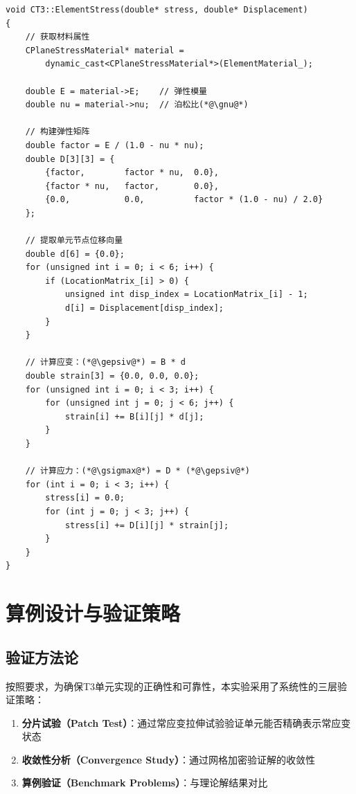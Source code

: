 \documentclass[12pt,a4paper]{article}
\begin{document}
\begin{lstlisting}[caption=单元应力计算实现]
void CT3::ElementStress(double* stress, double* Displacement)
{
    // 获取材料属性
    CPlaneStressMaterial* material = 
        dynamic_cast<CPlaneStressMaterial*>(ElementMaterial_);
    
    double E = material->E;    // 弹性模量
    double nu = material->nu;  // 泊松比(*@\gnu@*)
    
    // 构建弹性矩阵
    double factor = E / (1.0 - nu * nu);
    double D[3][3] = {
        {factor,        factor * nu,  0.0},
        {factor * nu,   factor,       0.0},
        {0.0,           0.0,          factor * (1.0 - nu) / 2.0}
    };
    
    // 提取单元节点位移向量
    double d[6] = {0.0};
    for (unsigned int i = 0; i < 6; i++) {
        if (LocationMatrix_[i] > 0) {
            unsigned int disp_index = LocationMatrix_[i] - 1;
            d[i] = Displacement[disp_index];
        }
    }
    
    // 计算应变：(*@\gepsiv@*) = B * d
    double strain[3] = {0.0, 0.0, 0.0};
    for (unsigned int i = 0; i < 3; i++) {
        for (unsigned int j = 0; j < 6; j++) {
            strain[i] += B[i][j] * d[j];
        }
    }
    
    // 计算应力：(*@\gsigmax@*) = D * (*@\gepsiv@*)
    for (int i = 0; i < 3; i++) {
        stress[i] = 0.0;
        for (int j = 0; j < 3; j++) {
            stress[i] += D[i][j] * strain[j];
        }
    }
}
\end{lstlisting}

\section{算例设计与验证策略}

\subsection{验证方法论}

按照要求，为确保T3单元实现的正确性和可靠性，本实验采用了系统性的三层验证策略：

\begin{enumerate}
    \item \textbf{分片试验（Patch Test）}：通过常应变拉伸试验验证单元能否精确表示常应变状态
    \item \textbf{收敛性分析（Convergence Study）}：通过网格加密验证解的收敛性
    \item \textbf{算例验证（Benchmark Problems）}：与理论解结果对比
\end{enumerate}
\end{document}
